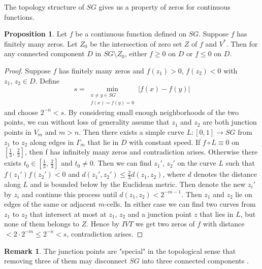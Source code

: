 \documentclass[12pt]{amsart}
\theoremstyle{plain}
\theoremstyle{definition}
\newtheorem{proposition}{Proposition}[section]
\newtheorem{remark}{Remark}[section]
\begin{document}
The topology structure of $SG$ gives us a property of zeros for continuous functions.
\begin{proposition}\label{pr:zeros}
Let $f$ be a continuous function defined on $SG$. Suppose $f$ has finitely many zeros. Let $Z_0$ be the intersection of zero set $Z$ of $f$ and $V^*$. Then for any connected component $D$ in $SG\setminus Z_0$, either $f\ge0$ on $D$ or $f\le0$ on $D$.
\end{proposition}
\begin{proof}
Suppose $f$ has finitely many zeros and $f(z_1)>0$, $f(z_2)<0$ with $z_1,\,z_2\in D$. Define $$s=\min\limits_{\substack{x\neq y\in SG\\f(x)=f(y)=0}}|f(x)-f(y)|$$ and choose $2^{-n}<s$. By considering small enough neighborhoods of the two points, we can without loss of generality assume that $z_1$ and $z_2$ are both junction points in $V_m$ and $m>n$. Then there exists a simple curve $L:[0,1]\rightarrow SG$ from $z_1$ to $z_2$ along edges in $\Gamma_m$ that lie in $D$ with constant speed. If $f\circ L\equiv0$ on $[\frac13,\, \frac23]$, then f has infinitely many zeros and contradiction arises. Otherwise there exists $t_0\in [\frac13,\, \frac23]$ and $t_0\neq 0$. Then we can find $z_1'$, $z_2'$ on the curve $L$ such that $f(z_1')f(z_2')<0$ and $d(z_1',z_2')\le\frac23 d(z_1, z_2)$, where $d$ denotes the distance along $L$ and is bounded below by the Euclidean metric. Then denote the new $z_i'$ by $z_i$ and continue this process until $d(z_1,z_2)<2^{-m-1}$. Then $z_1$ and $z_2$ lie on edges of the same or adjacent $m$-cells. In either case we can find two curves from $z_1$ to $z_2$ that intersect at most at $z_1$, $z_2$ and a junction point $z$ that lies in $L$, but none of them belongs to $Z$. Hence by $IVT$ we get two zeros of $f$ with distance $<2\cdot2^{-m}\le 2^{-n}<s$, contradiction arises.
\end{proof}
\begin{remark}
The junction points are "special" in the topological sense that removing three of them may disconnect $SG$ into three connected components \cite{S}\label{rm:junction}.
\end{remark}
\end{document}
